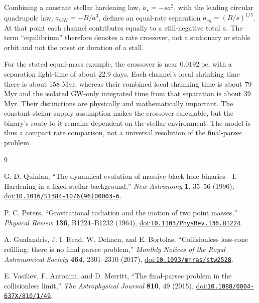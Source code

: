 \documentclass[12pt]{article}
\begin{document}
Combining a constant stellar hardening law, $\dot a_\star=-sa^2$, with the leading circular quadrupole law, $\dot a_{\mathrm{GW}}=-B/a^3$, defines an equal-rate separation $a_{\mathrm{eq}}=(B/s)^{1/5}$. At that point each channel contributes equally to a still-negative total $\dot a$. The term ``equilibrium'' therefore denotes a rate crossover, not a stationary or stable orbit and not the onset or duration of a stall.

For the stated equal-mass example, the crossover is near $0.0192\ \mathrm{pc}$, with a separation light-time of about 22.9 days. Each channel's local shrinking time there is about 158 Myr, whereas their combined local shrinking time is about 79 Myr and the isolated GW-only integrated time from that separation is about 39 Myr. Their distinctions are physically and mathematically important. The constant stellar-supply assumption makes the crossover calculable, but the binary's route to it remains dependent on the stellar environment. The model is thus a compact rate comparison, not a universal resolution of the final-parsec problem.

\begin{thebibliography}{9}
\small
{}
\raggedright
{}

G. D. Quinlan,
``The dynamical evolution of massive black hole binaries---I. Hardening in a fixed stellar background,''
\emph{New Astronomy} \textbf{1}, 35--56 (1996),
\href{https://doi.org/10.1016/S1384-1076(96)00003-6}{doi:\nolinkurl{10.1016/S1384-1076(96)00003-6}}.

P. C. Peters,
``Gravitational radiation and the motion of two point masses,''
\emph{Physical Review} \textbf{136}, B1224--B1232 (1964),
\href{https://doi.org/10.1103/PhysRev.136.B1224}{doi:\nolinkurl{10.1103/PhysRev.136.B1224}}.

A. Gualandris, J. I. Read, W. Dehnen, and E. Bortolas,
``Collisionless loss-cone refilling: there is no final parsec problem,''
\emph{Monthly Notices of the Royal Astronomical Society} \textbf{464}, 2301--2310 (2017),
\href{https://doi.org/10.1093/mnras/stw2528}{doi:\nolinkurl{10.1093/mnras/stw2528}}.

E. Vasiliev, F. Antonini, and D. Merritt,
``The final-parsec problem in the collisionless limit,''
\emph{The Astrophysical Journal} \textbf{810}, 49 (2015),
\href{https://doi.org/10.1088/0004-637X/810/1/49}{doi:\nolinkurl{10.1088/0004-637X/810/1/49}}.

\end{thebibliography}
\end{document}
